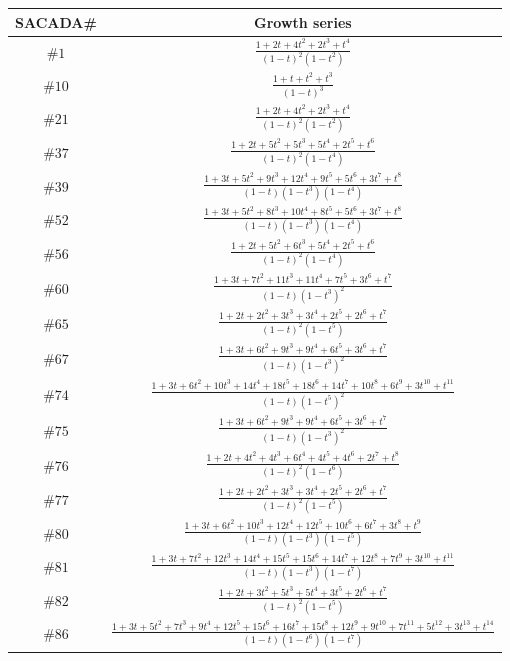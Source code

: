 \documentclass[ALCO,published]{cedram}
\theoremstyle{remark}
\begin{document}
\renewcommand{\arraystretch}{1.8}
\begin{table}[htp]
  \centering
  \begin{tabular}{cc}
    \hline
    {\sf SACADA}\# & Growth series  \\
    \hline \hline
    $\#1$ & $\frac{1+2 t+4 t^{2}+2 t^{3}+t^{4}}{\left(1-t\right)^{2} \left(1-t^{2}\right)}$\\ 
    $\#10$ & $\frac{1+t+t^{2}+t^{3}}{(1-t)^3}$\\
    $\#21$ & $\frac{1+2 t+4 t^{2}+2 t^{3}+t^{4}}{(1-t)^2(1-t^2)}$\\
    $\#37$ & $\frac{1+2 t+5 t^{2}+5 t^{3}+5 t^{4}+2 t^{5}+t^{6}}{(1-t)^2(1-t^4)}$\\
    $\#39$ & $\frac{1+3 t+5 t^{2}+9 t^{3}+12 t^{4}+9 t^{5}+5 t^{6}+3 t^{7}+t^{8}}{(1-t)(1-t^3)(1-t^4)}$ \\
    $\#52$ & $\frac{1+3 t+5 t^{2}+8 t^{3}+10 t^{4}+8 t^{5}+5 t^{6}+3 t^{7}+t^{8}}{(1-t)(1-t^3)(1-t^4)}$\\
    $\#56$ & $\frac{1+2 t+5 t^{2}+6 t^{3}+5 t^{4}+2 t^{5}+t^{6}}{(1-t)^2(1-t^4)}$\\
    $\#60$ & $\frac{1+3 t+7 t^{2}+11 t^{3}+11 t^{4}+7 t^{5}+3 t^{6}+t^{7}}{(1-t)(1-t^3)^2}$\\
    $\#65$ & $\frac{1+2 t+2 t^{2}+3 t^{3}+3 t^{4}+2 t^{5}+2 t^{6}+t^{7}}{(1-t)^2(1-t^5)}$\\
    $\#67$ & $\frac{1+3 t+6 t^{2}+9 t^{3}+9 t^{4}+6 t^{5}+3 t^{6}+t^{7}}{(1-t)(1-t^3)^2}$\\
    $\#74$ & $\frac{1+3 t+6 t^{2}+10 t^{3}+14 t^{4}+18 t^{5}+18 t^{6}+14 t^{7}+10 t^{8}+6 t^{9}+3 t^{10}+t^{11}}{(1-t)(1-t^5)^2}$ \\
    $\#75$ & $\frac{1+3 t+6 t^{2}+9 t^{3}+9 t^{4}+6 t^{5}+3 t^{6}+t^{7}}{(1-t)(1-t^3)^2}$\\
    $\#76$ & $\frac{1+2 t+4 t^{2}+4 t^{3}+6 t^{4}+4 t^{5}+4 t^{6}+2 t^{7}+t^{8}}{(1-t)^2(1-t^6)}$\\
    $\#77$ & $\frac{1+2 t+2 t^{2}+3 t^{3}+3 t^{4}+2 t^{5}+2 t^{6}+t^{7}}{(1-t)^2(1-t^5)}$\\
    $\#80$ & $\frac{1+3 t+6 t^{2}+10 t^{3}+12 t^{4}+12 t^{5}+10 t^{6}+6 t^{7}+3 t^{8}+t^{9}}{(1-t)(1-t^3)(1-t^5)}$ \\
    $\#81$ & $\frac{1+3 t+7 t^{2}+12 t^{3}+14 t^{4}+15 t^{5}+15 t^{6}+14 t^{7}+12 t^{8}+7 t^{9}+3 t^{10}+t^{11}}{(1-t)(1-t^3)(1-t^7)}$\\
    $\#82$ & $\frac{1+2 t+3 t^{2}+5 t^{3}+5 t^{4}+3 t^{5}+2 t^{6}+t^{7}}{(1-t)^2(1-t^5)}$\\
    $\#86$ & $\frac{1+3 t+5 t^{2}+7 t^{3}+9 t^{4}+12 t^{5}+15 t^{6}+16 t^{7}+15 t^{8}+12 t^{9}+9 t^{10}+7 t^{11}+5 t^{12}+3 t^{13}+t^{14}}{(1-t)(1-t^6)(1-t^7)}$\\

\end{tabular}
\end{table}
\end{document}
